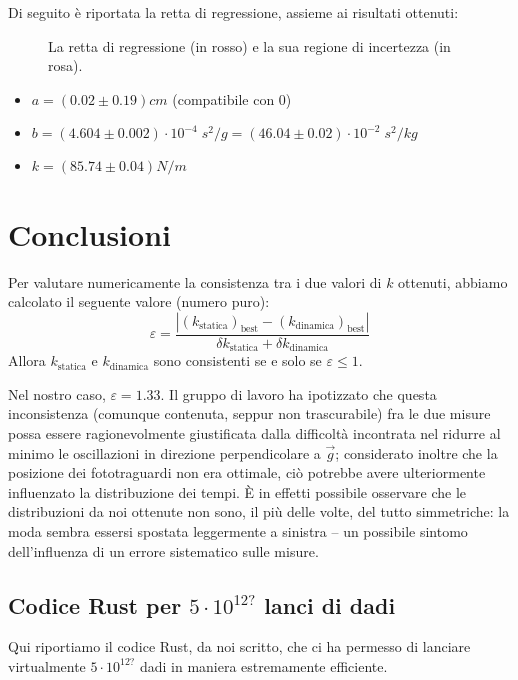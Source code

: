 \documentclass{article}
\begin{document}
Di seguito è riportata la retta di regressione, assieme ai risultati ottenuti:

\begin{figure}[H]
    \caption{
        La retta di regressione (in rosso)
        e la sua regione di incertezza (in rosa).
    }
\end{figure}

\begin{itemize}
    \item $a = \left(0.02\pm0.19\right)\unit{cm}$ (compatibile con 0)
    \item $
        b = \left(4.604\pm0.002\right)\cdot10^{-4}\;\unit{s^2\per g}
          = \left(46.04\pm0.02\right)\cdot10^{-2}\;\unit{s^2\per kg}
    $
    \item $k = \left(85.74\pm0.04\right)\unit{N\per m}$
\end{itemize}


\section{Conclusioni}
Per valutare numericamente la consistenza tra i due valori di $k$ ottenuti,
abbiamo calcolato il seguente valore (numero puro):
\[
    \varepsilon =
    \frac{
        \left|\left(k_\text{statica}\right)_\text{best} - \left(k_\text{dinamica}\right)_\text{best}\right|
    }{
        \delta k_\text{statica} + \delta k_\text{dinamica}
    }
\]
Allora $k_\text{statica}$ e $k_\text{dinamica}$ sono consistenti se e solo se $\varepsilon \le 1$.

Nel nostro caso, $\varepsilon = 1.33$. Il gruppo di lavoro ha ipotizzato che
questa inconsistenza (comunque contenuta, seppur non trascurabile) fra le due
misure possa essere ragionevolmente giustificata dalla difficoltà incontrata
nel ridurre al minimo le oscillazioni in direzione perpendicolare a $\vec{g}$;
considerato inoltre che la posizione dei fototraguardi non era ottimale, ciò
potrebbe avere ulteriormente influenzato la distribuzione dei tempi. È in
effetti possibile osservare che le distribuzioni da noi ottenute non sono,
il più delle volte, del tutto simmetriche: la moda sembra essersi spostata
leggermente a sinistra – un possibile sintomo dell'influenza di un
errore sistematico sulle misure.

\begin{appendices}
    \section{Codice Rust per $5\cdot10^{12?}$ lanci di dadi}
    Qui riportiamo il codice Rust, da noi scritto, che ci ha permesso di
    lanciare virtualmente $5\cdot10^{12?}$ dadi in maniera estremamente
    efficiente.

    \inputminted[linenos, mathescape]{rust}{src/main.rs}
\end{appendices}
\end{document}
